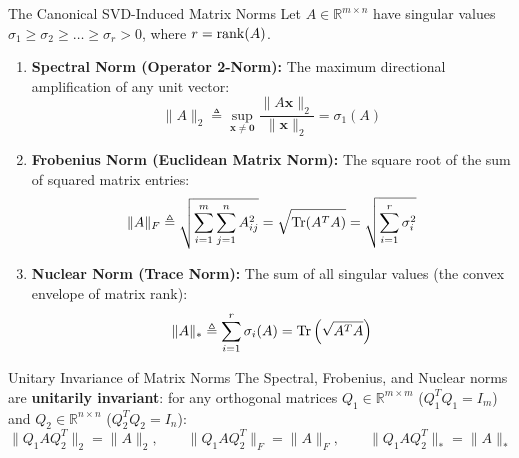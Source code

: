 \begin{definitionbox}{The Canonical SVD-Induced Matrix Norms}
Let $A \in \mathbb{R}^{m \times n}$ have singular values $\sigma_1 \ge \sigma_2 \ge \dots \ge \sigma_r > 0$, where $r = \operatorname{rank}(A)$.
\begin{enumerate}
    \item \textbf{Spectral Norm (Operator 2-Norm):} The maximum directional amplification of any unit vector:
    \begin{equation}
    \|A\|_2 \triangleq \sup_{\mathbf{x} \ne \mathbf{0}} \frac{\|A\mathbf{x}\|_2}{\|\mathbf{x}\|_2} = \sigma_1(A)
    \label{eq:spectral_norm_def}
    \end{equation}
    \item \textbf{Frobenius Norm (Euclidean Matrix Norm):} The square root of the sum of squared matrix entries:
    \begin{equation}
    \|A\|_F \triangleq \sqrt{\sum_{i=1}^m \sum_{j=1}^n A_{ij}^2} = \sqrt{\operatorname{Tr}(A^T A)} = \sqrt{\sum_{i=1}^r \sigma_i^2}
    \label{eq:frobenius_norm_svd}
    \end{equation}
    \item \textbf{Nuclear Norm (Trace Norm):} The sum of all singular values (the convex envelope of matrix rank):
    \begin{equation}
    \|A\|_* \triangleq \sum_{i=1}^r \sigma_i(A) = \operatorname{Tr}\left(\sqrt{A^T A}\right)
    \label{eq:nuclear_norm_def}
    \end{equation}
\end{enumerate}
\end{definitionbox}

\begin{theorembox}{Unitary Invariance of Matrix Norms}
The Spectral, Frobenius, and Nuclear norms are \textbf{unitarily invariant}: for any orthogonal matrices $Q_1 \in \mathbb{R}^{m \times m}$ ($Q_1^T Q_1 = I_m$) and $Q_2 \in \mathbb{R}^{n \times n}$ ($Q_2^T Q_2 = I_n$):
\begin{equation}
\|Q_1 A Q_2^T\|_2 = \|A\|_2, \qquad \|Q_1 A Q_2^T\|_F = \|A\|_F, \qquad \|Q_1 A Q_2^T\|_* = \|A\|_*
\end{equation}
\end{theorembox}

